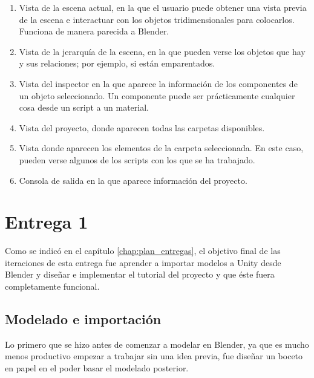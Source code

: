 \begin{enumerate}
    \item Vista de la escena actual, en la que el usuario puede obtener una vista previa de la escena e interactuar con los objetos tridimensionales para colocarlos. Funciona de manera parecida a Blender.
    
    \item Vista de la jerarquía de la escena, en la que pueden verse los objetos que hay y sus relaciones; por ejemplo, si están emparentados.
    
    \item Vista del inspector en la que aparece la información de los componentes de un objeto seleccionado. Un componente puede ser prácticamente cualquier cosa desde un script a un material.
    
    \item Vista del proyecto, donde aparecen todas las carpetas disponibles.
    
    \item Vista donde aparecen los elementos de la carpeta seleccionada. En este caso, pueden verse algunos de los scripts con los que se ha trabajado.
    
    \item Consola de salida en la que aparece información del proyecto.
\end{enumerate}


\section{Entrega 1}

Como se indicó en el capítulo \ref{chap:plan_entregas}, el objetivo final de las iteraciones de esta entrega fue aprender a importar modelos a Unity desde Blender y diseñar e implementar el tutorial del proyecto y que éste fuera completamente funcional. 

\subsection{Modelado e importación}

Lo primero que se hizo antes de comenzar a modelar en Blender, ya que es mucho menos productivo empezar a trabajar sin una idea previa, fue diseñar un boceto en papel en el poder basar el modelado posterior.

